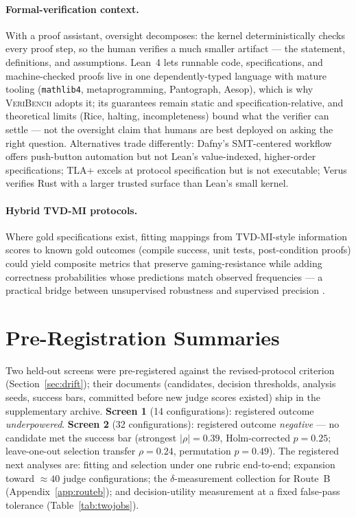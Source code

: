 \documentclass{article}
\begin{document}
\paragraph{Formal-verification context.}
With a proof assistant, oversight decomposes: the kernel deterministically checks every proof step, so the human verifies a much smaller artifact --- the statement, definitions, and assumptions.
Lean~4 lets runnable code, specifications, and machine-checked proofs live in one dependently-typed language with mature tooling (\texttt{mathlib4}, metaprogramming, Pantograph, Aesop), which is why \textsc{VeriBench} adopts it; its guarantees remain static and specification-relative, and theoretical limits (Rice, halting, incompleteness) bound what the verifier can settle --- not the oversight claim that humans are best deployed on asking the right question.
Alternatives trade differently: Dafny's SMT-centered workflow offers push-button automation but not Lean's value-indexed, higher-order specifications; TLA+ excels at protocol specification but is not executable; Verus verifies Rust with a larger trusted surface than Lean's small kernel.

\paragraph{Hybrid TVD-MI protocols.}
Where gold specifications exist, fitting mappings from TVD-MI-style information scores to known gold outcomes (compile success, unit tests, post-condition proofs) could yield composite metrics that preserve gaming-resistance while adding correctness probabilities whose predictions match observed frequencies --- a practical bridge between unsupervised robustness and supervised precision \citep{robertson2025stepbystep}.

\section{Pre-Registration Summaries}\label{app:prereg}
Two held-out screens were pre-registered against the revised-protocol criterion (Section~\ref{sec:drift}); their documents (candidates, decision thresholds, analysis seeds, success bars, committed before new judge scores existed) ship in the supplementary archive.
\textbf{Screen 1} (14 configurations): registered outcome \emph{underpowered}.
\textbf{Screen 2} (32 configurations): registered outcome \emph{negative} --- no candidate met the success bar (strongest $|\rho|=0.39$, Holm-corrected $p=0.25$; leave-one-out selection transfer $\rho=0.24$, permutation $p=0.49$).
The registered next analyses are: fitting and selection under one rubric end-to-end; expansion toward ${\approx}40$ judge configurations; the $\delta$-measurement collection for Route~B (Appendix~\ref{app:routeb}); and decision-utility measurement at a fixed false-pass tolerance (Table~\ref{tab:twojobs}).
\end{document}
